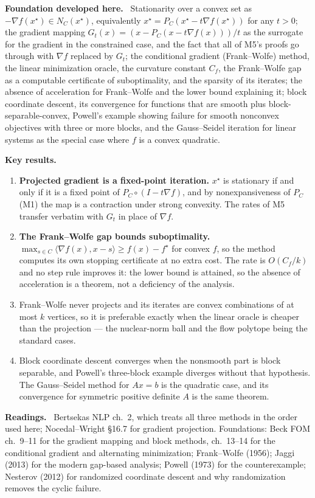 \documentclass[11pt,a4paper]{article}
\newcommand{\mpart}[1]{\smallskip\noindent\textbf{#1}\ \ignorespaces}
\begin{document}
\mpart{Foundation developed here.} Stationarity over a convex set as
$-\nabla f(x^\star) \in N_C(x^\star)$, equivalently $x^\star=P_C(x^\star-t\nabla f(x^\star))$
for any $t>0$; the gradient mapping $G_t(x)=(x-P_C(x-t\nabla f(x)))/t$ as the surrogate for
the gradient in the constrained case, and the fact that all of M5's proofs go through with
$\nabla f$ replaced by $G_t$; the conditional gradient (Frank--Wolfe) method, the linear
minimization oracle, the curvature constant $C_f$, the Frank--Wolfe gap as a computable
certificate of suboptimality, and the sparsity of its iterates; the absence of acceleration
for Frank--Wolfe and the lower bound explaining it; block coordinate descent, its convergence
for functions that are smooth plus block-separable-convex, Powell's example showing failure
for smooth nonconvex objectives with three or more blocks, and the Gauss--Seidel iteration for
linear systems as the special case where $f$ is a convex quadratic.

\mpart{Key results.}
\begin{enumerate}
\item \textbf{Projected gradient is a fixed-point iteration.} $x^\star$ is stationary if and
only if it is a fixed point of $P_C \circ (I-t\nabla f)$, and by nonexpansiveness of $P_C$
(M1) the map is a contraction under strong convexity. The rates of M5 transfer verbatim with
$G_t$ in place of $\nabla f$.
\item \textbf{The Frank--Wolfe gap bounds suboptimality.} $\max_{s\in C}\langle\nabla f(x),
x-s\rangle \ge f(x)-f^\star$ for convex $f$, so the method computes its own stopping
certificate at no extra cost. The rate is $O(C_f/k)$ and no step rule improves it: the lower
bound is attained, so the absence of acceleration is a theorem, not a deficiency of the
analysis.
\item Frank--Wolfe never projects and its iterates are convex combinations of at most $k$
vertices, so it is preferable exactly when the linear oracle is cheaper than the projection ---
the nuclear-norm ball and the flow polytope being the standard cases.
\item Block coordinate descent converges when the nonsmooth part is block separable, and
Powell's three-block example diverges without that hypothesis. The Gauss--Seidel method for
$Ax=b$ is the quadratic case, and its convergence for symmetric positive definite $A$ is the
same theorem.
\end{enumerate}

\mpart{Readings.} Bertsekas NLP ch.~2, which treats all three methods in the order used here;
Nocedal--Wright \S 16.7 for gradient projection. Foundations: Beck FOM ch.~9--11 for the
gradient mapping and block methods, ch.~13--14 for the conditional gradient and alternating
minimization; Frank--Wolfe (1956); Jaggi (2013) for the modern gap-based analysis;
Powell (1973) for the counterexample; Nesterov (2012) for randomized coordinate descent and
why randomization removes the cyclic failure.
\end{document}
